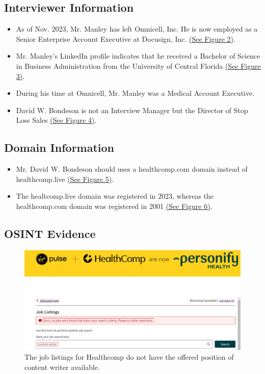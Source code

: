 \begin{fullwidth}
\subsection{Interviewer Information}
    \begin{itemize}
        \item As of Nov. 2023, Mr. Manley has left Omnicell, Inc. He is now employed as a Senior Enterprise Account Executive at Docusign, Inc. \hyperref[sec:Fig2]{(See Figure 2)}.
    \\\medskip
        \item Mr. Manley's LinkedIn profile indicates that he received a Bachelor of Science in Business Administration from the University of Central Florida \hyperref[sec:Fig3]{(See Figure 3)}.
    \\\medskip        
        \item During his time at Omnicell, Mr. Manley was a Medical Account Executive.
    \\\medskip        
        \item David W. Bondeson is not an Interview Manager but the Director of Stop Loss Sales \hyperref[sec:Fig4]{(See Figure 4)}.
    
    \end{itemize}

\subsection{Domain Information}
    \begin{itemize}
        \item Mr. David W. Bondeson should uses a healthcomp.com domain instead of healthcomp.live \hyperref[sec:Fig5]{(See Figure 5)}.
        \item The healtcomp.live domain was registered in 2023, whereas the healthcomp.com domain was registered in 2001 \hyperref[sec:Fig6]{(See Figure 6)}.
    \end{itemize}

\subsection{OSINT Evidence}
    \begin{figure}[H] %
        \label{sec:Fig1}
        \centering
        \includegraphics[width=.9\linewidth]{assets/realJobPosting.png}
        \captionsetup{justification=centering}
        \caption{The job listings for Healthcomp do not have the offered position of content writer available.}
    \end{figure}
    

\end{fullwidth}

